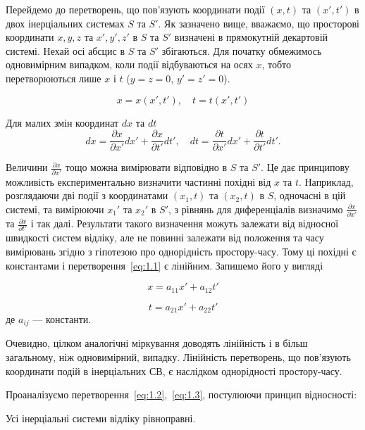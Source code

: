 Перейдемо до перетворень, що пов'язують координати події $(x, t)$ та $(x', t')$ в двох інерціальних системах $S$ та $S'$. Як зазначено вище, вважаємо, що просторові координати $x, y, z$ та $x', y', z'$ в $S$ та $S'$ визначені в прямокутній декартовій системі. Нехай осі абсцис в $S$ та $S'$ збігаються. Для початку обмежимось одновимірним випадком, коли події відбуваються на осях $x$, тобто перетворюються лише $x$ і $t$ ($y=z=0$, $y'=z'=0$).

\begin{equation}
x = x(x', t'), \quad t = t(x', t')
\label{eq:1.1}
\end{equation}

Для малих змін координат $dx$ та $dt$
\[
dx = \frac{\partial x}{\partial x'} dx' + \frac{\partial x}{\partial t'} dt', \quad
dt = \frac{\partial t}{\partial x'} dx' + \frac{\partial t}{\partial t'} dt'.
\]

Величини $\frac{\partial x}{\partial x'}$ тощо можна вимірювати відповідно в $S$ та $S'$. Це дає принципову можливість експериментально визначити частинні похідні від $x$ та $t$. Наприклад, розглядаючи дві події з координатами $(x_1, t)$ та $(x_2, t)$ в $S$, одночасні в цій системі, та вимірюючи $x_1'$ та $x_2'$ в $S'$, з рівнянь для диференціалів визначимо $\frac{\partial x}{\partial x'}$ та $\frac{\partial x}{\partial t'}$ і так далі. Результати такого визначення можуть залежати від відносної швидкості систем відліку, але не повинні залежати від положення та часу вимірювань згідно з гіпотезою про однорідність простору-часу. Тому ці похідні є константами і перетворення~\eqref{eq:1.1} є лінійним. Запишемо його у вигляді

\begin{equation}
x = a_{11} x' + a_{12} t'
\label{eq:1.2}
\end{equation}

\begin{equation}
t = a_{21} x' + a_{22} t'
\label{eq:1.3}
\end{equation}
де $a_{ij}$ --- константи.

Очевидно, цілком аналогічні міркування доводять лінійність і в більш загальному, ніж одновимірний, випадку. Лінійність перетворень, що пов’язують координати подій в інерціальних СВ, є наслідком однорідності простору-часу.

Проаналізуємо перетворення~\eqref{eq:1.2},~\eqref{eq:1.3}, постулюючи принцип відносності:



\begin{postulate}{}
Усі інерціальні системи відліку рівноправні.
\end{postulate}

